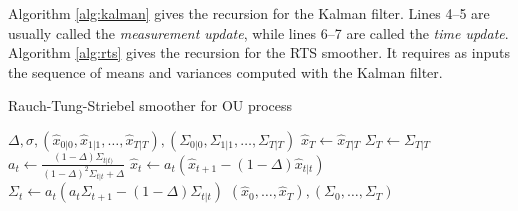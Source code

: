 \documentclass[fleqn]{article}
\begin{document}
Algorithm \ref{alg:kalman} gives the recursion for the Kalman filter. Lines 4--5 are usually called the \emph{measurement update}, while lines 6--7 are called the \emph{time update}. 
Algorithm \ref{alg:rts} gives the recursion for the RTS smoother. It requires as inputs the sequence of means and variances computed with the Kalman filter.

\begin{algorithm}
\caption{Rauch-Tung-Striebel smoother for OU process}
\label{alg:rts}
\begin{algorithmic}[1]
\Require $\Delta, \sigma, (\hat{x}_{0|0}, \hat{x}_{1|1}, \dots, \hat{x}_{T|T}), (\Sigma_{0|0}, \Sigma_{1|1}, \dots, \Sigma_{T|T})$
\State $\hat{x}_T \gets \hat{x}_{T|T}$
\State $\Sigma_T \gets \Sigma_{T|T}$
	\State $a_t \gets \frac{(1-\Delta) \Sigma_{t|t)}}{(1-\Delta)^2 \Sigma_{t|t}+ \Delta}$
	\State $\hat{x}_t \gets a_t (\hat{x}_{t+1} - (1-\Delta)\hat{x}_{t|t})$
	\State $\Sigma_t \gets a_t (a_t \Sigma_{t+1} - (1-\Delta) \Sigma_{t|t})$
\EndFor
\State\Return $(\hat{x}_0, \dots, \hat{x}_T), (\Sigma_0, \dots, \Sigma_T)$
\end{algorithmic}
\end{algorithm}


\end{document}
